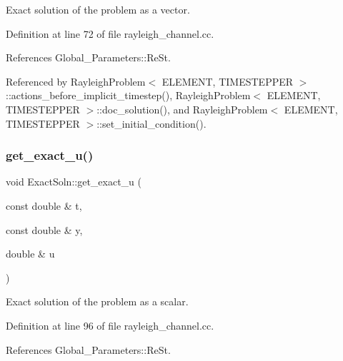 Exact solution of the problem as a vector. 



Definition at line 72 of file rayleigh\+\_\+channel.\+cc.



References Global\+\_\+\+Parameters\+::\+Re\+St.



Referenced by Rayleigh\+Problem$<$ E\+L\+E\+M\+E\+N\+T, T\+I\+M\+E\+S\+T\+E\+P\+P\+E\+R $>$\+::actions\+\_\+before\+\_\+implicit\+\_\+timestep(), Rayleigh\+Problem$<$ E\+L\+E\+M\+E\+N\+T, T\+I\+M\+E\+S\+T\+E\+P\+P\+E\+R $>$\+::doc\+\_\+solution(), and Rayleigh\+Problem$<$ E\+L\+E\+M\+E\+N\+T, T\+I\+M\+E\+S\+T\+E\+P\+P\+E\+R $>$\+::set\+\_\+initial\+\_\+condition().

\mbox{\label{namespaceExactSoln_ae21d368b911f958acec957ead190db93}} 
\subsubsection{\texorpdfstring{get\+\_\+exact\+\_\+u()}{get\_exact\_u()}\hspace{0.1cm}{\footnotesize\ttfamily [2/2]}}
{\footnotesize\ttfamily void Exact\+Soln\+::get\+\_\+exact\+\_\+u (\begin{DoxyParamCaption}\item[{const double \&}]{t,  }\item[{const double \&}]{y,  }\item[{double \&}]{u }\end{DoxyParamCaption})}



Exact solution of the problem as a scalar. 



Definition at line 96 of file rayleigh\+\_\+channel.\+cc.



References Global\+\_\+\+Parameters\+::\+Re\+St.

